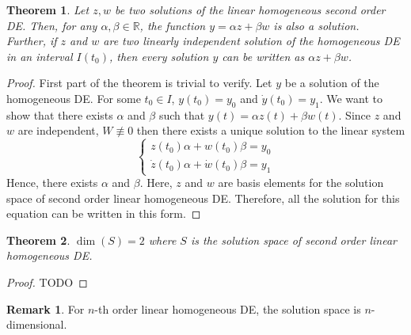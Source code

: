 \documentclass[12pt,reqno]{amsart}
\theoremstyle{plain}
\newtheorem{thm}{Theorem}
\theoremstyle{definition}
\newtheorem{rem}{Remark}
\newcommand{\R}{\mathbb{R}}
\begin{document}
\begin{thm}
    Let $z,w$ be two solutions of the linear homogeneous second order DE. Then, for any $\alpha, \beta \in \R$, the function $y = \alpha z + \beta w$ is also a solution.\\ Further, if $z$ and $w$ are two linearly independent solution of the homogeneous DE in an interval $I(t_0)$, then every solution $y$ can be written as $\alpha z + \beta w$.
\end{thm}
\begin{proof}
    First part of the theorem is trivial to verify. Let $y$ be a solution of the homogeneous DE. For some $t_0 \in I$, $y(t_0) = y_0 $ and $\dot{y}(t_0) = y_1$. We want to show that there exists $\alpha$ and $\beta$ such that $y(t) = \alpha z(t) + \beta w (t)$. Since $z$ and $w$ are independent, $W \not\equiv 0$ then there exists a unique solution to the linear system
    $$ \left\{
    \begin{array}{l}
        z(t_0)\alpha + w(t_0)\beta = y_0 \\
        \dot{z}(t_0) \alpha + \dot{w}(t_0) \beta = y_1
    \end{array}
    \right.
    $$
    Hence, there exists $\alpha $ and $\beta$. Here, $z$ and $w$ are basis elements for the solution space of second order linear homogeneous DE. Therefore, all the solution for this equation can be written in this form.
\end{proof}
\begin{thm}
    $\dim(S) = 2$ where $S$ is the solution space of second order linear homogeneous DE.
\end{thm}
\begin{proof}
    TODO
\end{proof}
\begin{rem}
    For $n$-th order linear homogeneous DE, the solution space is $n$-dimensional.
\end{rem}
\end{document}
